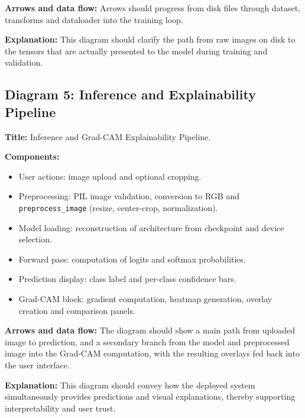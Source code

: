 \textbf{Arrows and data flow:} Arrows should progress from disk files through dataset, transforms and dataloader into the training loop.

\textbf{Explanation:} This diagram should clarify the path from raw images on disk to the tensors that are actually presented to the model during training and validation.

\subsection*{Diagram 5: Inference and Explainability Pipeline}

\textbf{Title:} Inference and Grad-CAM Explainability Pipeline.

\textbf{Components:}
\begin{itemize}
  \item User actions: image upload and optional cropping.
  \item Preprocessing: PIL image validation, conversion to RGB and \texttt{preprocess\_image} (resize, center-crop, normalization).
  \item Model loading: reconstruction of architecture from checkpoint and device selection.
  \item Forward pass: computation of logits and softmax probabilities.
  \item Prediction display: class label and per-class confidence bars.
  \item Grad-CAM block: gradient computation, heatmap generation, overlay creation and comparison panels.
\end{itemize}

\textbf{Arrows and data flow:} The diagram should show a main path from uploaded image to prediction, and a secondary branch from the model and preprocessed image into the Grad-CAM computation, with the resulting overlays fed back into the user interface.

\textbf{Explanation:} This diagram should convey how the deployed system simultaneously provides predictions and visual explanations, thereby supporting interpretability and user trust.

